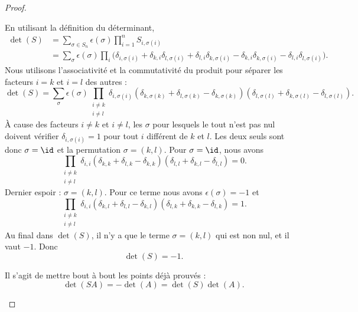 \begin{proof}
\begin{subproof}
		\spitem[\ref{ITEMooSHRQooQrqVdO}]
		En utilisant la définition du déterminant,
		\begin{subequations}
			\begin{align}
				\det(S) & =\sum_{\sigma\in S_n}\epsilon(\sigma)\prod_{i=1}^n S_{i,\sigma(i)}                                                                                                                                          \\
				        & =\sum_{\sigma}\epsilon(\sigma)\prod_i\big( \delta_{i,\sigma(i)}+\delta_{k,i}\delta_{l,\sigma(i)}+\delta_{l,i}\delta_{k,\sigma(i)}-\delta_{k,i}\delta_{k,\sigma(i)}-\delta_{l,i}\delta_{l,\sigma(i)} \big).
			\end{align}
		\end{subequations}
		Nous utilisons l'associativité et la commutativité du produit pour séparer les facteurs \( i=k\) et \( i=l\) des autres :
		\begin{equation}
			\det(S)=\sum_{\sigma}\epsilon(\sigma)\prod_{\substack{i\neq k \\i\neq l}}\delta_{i,\sigma(i)}(\delta_{k,\sigma(k)}+\delta_{l,\sigma(k)}-\delta_{k,\sigma(k)})(\delta_{l,\sigma(l)}+\delta_{k,\sigma(l)}-\delta_{l,\sigma(l)}).
		\end{equation}
		À cause des facteurs \( i\neq k\) et \( i\neq l\), les \( \sigma\) pour lesquels le tout n'est pas nul doivent vérifier \( \delta_{i,\sigma(i)}=1\) pour tout \( i\) différent de \( k\) et \( l\). Les deux seuls sont donc \( \sigma=\id\) et la permutation \( \sigma=(k,l)\). Pour \( \sigma=\id\), nous avons
		\begin{equation}
			\prod_{\substack{i\neq k \\i\neq l}}\delta_{i,i}(\delta_{k,k}+\delta_{l,k}-\delta_{k,k})(\delta_{l,l}+\delta_{k,l}-\delta_{l,l})=0.
		\end{equation}
		Dernier espoir : \( \sigma=(k,l)\). Pour ce terme nous avons \( \epsilon(\sigma)=-1\) et
		\begin{equation}
			\prod_{\substack{i\neq k \\i\neq l}}\delta_{i,i}(\delta_{k,l}+\delta_{l,l}-\delta_{k,l})(\delta_{l,k}+\delta_{k,k}-\delta_{l,k})=1.
		\end{equation}
		Au final dans \( \det(S)\), il n'y a que le terme \( \sigma=(k,l)\) qui est non nul, et il vaut \( -1\). Donc
		\begin{equation}
			\det(S)=-1.
		\end{equation}

		\spitem[\ref{ITEMooQXSEooMWiKbL}]
		Il s'agit de mettre bout à bout les points déjà prouvés :
		\begin{equation}
			\det(SA)=-\det(A)=\det(S)\det(A).
		\end{equation}
	\end{subproof}
\end{proof}

